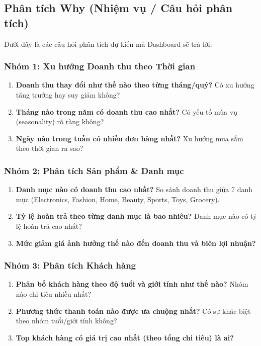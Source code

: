 \documentclass[12pt,a4paper]{article}
\begin{document}
\subsection{Phân tích Why (Nhiệm vụ / Câu hỏi phân tích)}

Dưới đây là các câu hỏi phân tích dự kiến mà Dashboard sẽ trả lời:

\subsubsection{Nhóm 1: Xu hướng Doanh thu theo Thời gian}

\begin{enumerate}[leftmargin=1.5cm]
    \item \textbf{Doanh thu thay đổi như thế nào theo từng tháng/quý?} Có xu hướng tăng trưởng hay suy giảm không?
    \item \textbf{Tháng nào trong năm có doanh thu cao nhất?} Có yếu tố mùa vụ (seasonality) rõ ràng không?
    \item \textbf{Ngày nào trong tuần có nhiều đơn hàng nhất?} Xu hướng mua sắm theo thời gian ra sao?
\end{enumerate}

\subsubsection{Nhóm 2: Phân tích Sản phẩm \& Danh mục}

\begin{enumerate}[leftmargin=1.5cm, start=4]
    \item \textbf{Danh mục nào có doanh thu cao nhất?} So sánh doanh thu giữa 7 danh mục (Electronics, Fashion, Home, Beauty, Sports, Toys, Grocery).
    \item \textbf{Tỷ lệ hoàn trả theo từng danh mục là bao nhiêu?} Danh mục nào có tỷ lệ hoàn trả cao nhất?
    \item \textbf{Mức giảm giá ảnh hưởng thế nào đến doanh thu và biên lợi nhuận?}
\end{enumerate}

\subsubsection{Nhóm 3: Phân tích Khách hàng}

\begin{enumerate}[leftmargin=1.5cm, start=7]
    \item \textbf{Phân bố khách hàng theo độ tuổi và giới tính như thế nào?} Nhóm nào chi tiêu nhiều nhất?
    \item \textbf{Phương thức thanh toán nào được ưa chuộng nhất?} Có sự khác biệt theo nhóm tuổi/giới tính không?
    \item \textbf{Top khách hàng có giá trị cao nhất (theo tổng chi tiêu) là ai?}
\end{enumerate}
\end{document}
